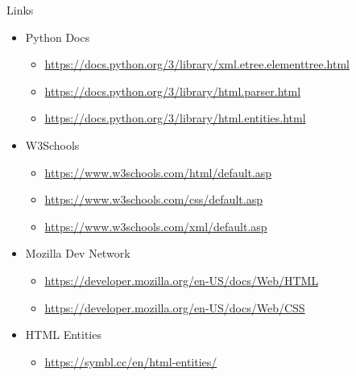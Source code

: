 \begin{frame}{Links}
%
\begin{itemize}
\item Python Docs
	\begin{itemize}
	\item \url{https://docs.python.org/3/library/xml.etree.elementtree.html}
	\item \url{https://docs.python.org/3/library/html.parser.html}
	\item \url{https://docs.python.org/3/library/html.entities.html}
	\end{itemize}
\item W3Schools
	\begin{itemize}
	\item \url{https://www.w3schools.com/html/default.asp}
	\item \url{https://www.w3schools.com/css/default.asp}
	\item \url{https://www.w3schools.com/xml/default.asp}
	\end{itemize}
\item Mozilla Dev Network
	\begin{itemize}
	\item \url{https://developer.mozilla.org/en-US/docs/Web/HTML}
	\item \url{https://developer.mozilla.org/en-US/docs/Web/CSS}
	\end{itemize}
\item HTML Entities
	\begin{itemize}
	\item \url{https://symbl.cc/en/html-entities/}
	\end{itemize}
\end{itemize}
%
\end{frame}

